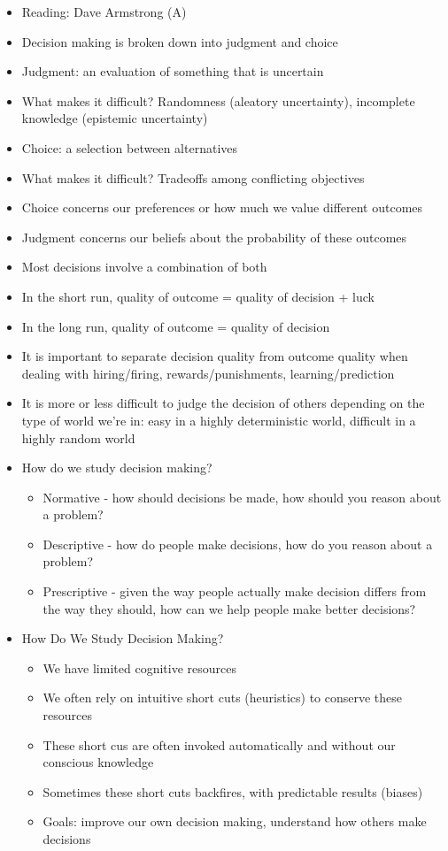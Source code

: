 \documentclass[12pt]{article}
\begin{document}
\begin{itemize}
\item Reading: Dave Armstrong (A)
\item Decision making is broken down into judgment and choice
\item Judgment: an evaluation of something that is uncertain 
\item What makes it difficult? Randomness (aleatory uncertainty), incomplete knowledge (epistemic uncertainty)
\item Choice: a selection between alternatives 
\item What makes it difficult? Tradeoffs among conflicting objectives 
\item Choice concerns our preferences or how much we value different outcomes 
\item Judgment concerns our beliefs about the probability of these outcomes 
\item Most decisions involve a combination of both 
\item In the short run, quality of outcome = quality of decision + luck 
\item In the long run, quality of outcome = quality of decision 
\item It is important to separate decision quality from outcome quality when dealing with hiring/firing, rewards/punishments, learning/prediction
\item It is more or less difficult to judge the decision of others depending on the type of world we're in: easy in a highly deterministic world, difficult in a highly random world 
\item How do we study decision making? \begin{itemize} 
\item Normative - how should decisions be made, how should you reason about a problem? 
\item Descriptive - how do people make decisions, how do you reason about a problem?
\item Prescriptive - given the way people actually make decision differs from the way they should, how can we help people make better decisions? \end{itemize} 
\item How Do We Study Decision Making? \begin{itemize} 
\item We have limited cognitive resources
\item We often rely on intuitive short cuts (heuristics) to conserve these resources
\item These short cus are often invoked automatically and without our conscious knowledge
\item Sometimes these short cuts backfires, with predictable results (biases) 
\item Goals: improve our own decision making, understand how others make decisions
\end{itemize}
\end{itemize}
\newpage
\end{document}
